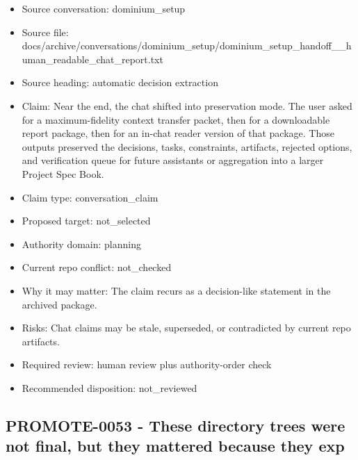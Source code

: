 \documentclass[11pt,a4paper]{report}
\begin{document}
\begin{itemize}
\item Source conversation: dominium\_setup
\item Source file: docs/archive/conversations/dominium\_setup/dominium\_setup\_handoff\_\_human\_readable\_chat\_report.txt
\item Source heading: automatic decision extraction
\item Claim: Near the end, the chat shifted into preservation mode. The user asked for a maximum-fidelity context transfer packet, then for a downloadable report package, then for an in-chat reader version of that package. Those outputs preserved the decisions, tasks, constraints, artifacts, rejected options, and verification queue for future assistants or aggregation into a larger Project Spec Book.
\item Claim type: conversation\_claim
\item Proposed target: not\_selected
\item Authority domain: planning
\item Current repo conflict: not\_checked
\item Why it may matter: The claim recurs as a decision-like statement in the archived package.
\item Risks: Chat claims may be stale, superseded, or contradicted by current repo artifacts.
\item Required review: human review plus authority-order check
\item Recommended disposition: not\_reviewed
\end{itemize}

\subsection{PROMOTE-0053 - These directory trees were not final, but they mattered because they exp}
\end{document}
